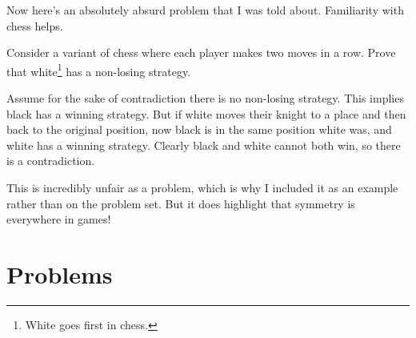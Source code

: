 \documentclass[mast]{lucky}
\begin{document}
Now here's an absolutely absurd problem that I was told about. Familiarity with chess helps.

\begin{exam}
Consider a variant of chess where each player makes two moves in a row. Prove that white\footnote{White goes first in chess.} has a non-losing strategy.
\end{exam}

\begin{sol}
Assume for the sake of contradiction there is no non-losing strategy. This implies black has a winning strategy. But if white moves their knight to a place and then back to the original position, now black is in the same position white was, and white has a winning strategy. Clearly black and white cannot both win, so there is a contradiction.
\end{sol}
This is incredibly unfair as a problem, which is why I included it as an example rather than on the problem set. But it does highlight that symmetry is everywhere in games!

\pagebreak

\section{Problems}
\end{document}
